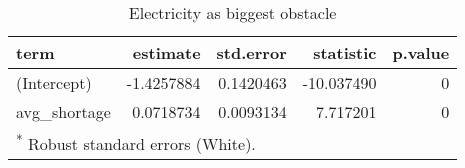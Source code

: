 \begin{table}

\caption{\label{tab:}Electricity as biggest obstacle}
\centering
\begin{tabular}[t]{lrrrr}
\toprule
term & estimate & std.error & statistic & p.value\\
\midrule
(Intercept) & -1.4257884 & 0.1420463 & -10.037490 & 0\\
avg\_shortage & 0.0718734 & 0.0093134 & 7.717201 & 0\\
\bottomrule
\multicolumn{5}{l}{\textsuperscript{*} Robust standard errors (White).}\\
\end{tabular}
\end{table}
